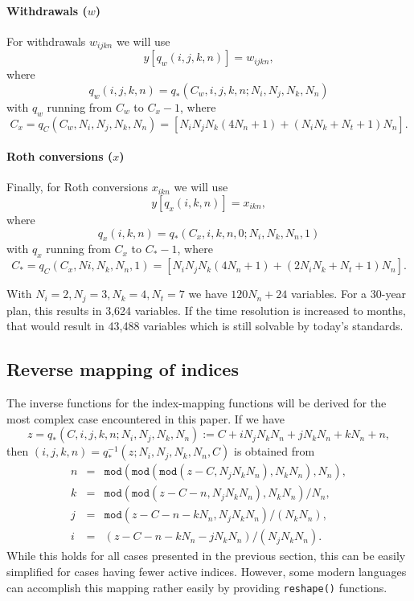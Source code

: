 \documentclass{article}[fleqn,12pt]
\begin{document}
\paragraph*{Withdrawals (\boldmath$w$)}
For withdrawals $w_{ijkn}$ we will use
\begin{equation}
	y[q_w(i, j, k, n)] = w_{i j k n},
\end{equation}
where
\begin{equation}
	q_w(i, j, k, n) = q_*(C_w, i, j, k, n; N_i, N_j, N_k, N_n)
\end{equation}
with $q_w$ running from $C_w$ to $C_x - 1$, where
\[
	C_x = q_C(C_w, N_i, N_j, N_k, N_n) = [N_iN_jN_k(4N_n + 1) + (N_iN_k + N_t + 1) N_n].
\]

\paragraph*{Roth conversions (\boldmath$x$)}
Finally, for Roth conversions $x_{ikn}$ we will use
\begin{equation}
	y[q_x(i, k, n)] = x_{i k n},
\end{equation}
where
\begin{equation}
	q_x(i, k, n) = q_*(C_x, i, k, n, 0; N_i, N_k, N_n, 1)
\end{equation}
with $q_x$ running from $C_x$ to $C_* - 1$, where
\[
	C_* = q_C(C_x, Ni, N_k, N_n, 1) = [N_iN_jN_k(4N_n + 1) + (2N_iN_k + N_t + 1) N_n].
\]

With $N_i = 2, N_j = 3, N_k = 4, N_t = 7$ we have $120N_n + 24$ variables. For
a 30-year plan, this results in 3,624 variables. If the time resolution is increased to
months, that would result in 43,488 variables which is still solvable by today's standards.

\subsection{Reverse mapping of indices}
The inverse functions for the index-mapping functions will be derived for the
most complex case encountered in this paper.
If we have
\begin{equation}
	z = q_*(C, i, j, k, n; N_i, N_j, N_k, N_n) := C + iN_jN_kN_n + jN_kN_n + kN_n + n,
\end{equation}
then $(i, j, k, n) = q_*^{-1}(z; N_i, N_j, N_k, N_n, C)$ is obtained from
\begin{eqnarray}
	n &=& \texttt{mod}(\texttt{mod}(\texttt{mod}(z - C, N_jN_kN_n), N_kN_n), N_n), \nonumber \\
	k &=& \texttt{mod}(\texttt{mod}(z - C - n, N_jN_kN_n), N_kN_n)/N_n, \nonumber \\
	j &=& \texttt{mod}(z - C - n - kN_n, N_jN_kN_n)/(N_kN_n), \nonumber \\
	i &=& (z - C - n - kN_n - jN_kN_n)/(N_jN_kN_n).
\end{eqnarray}
While this holds for all cases presented in the previous section, this can be easily simplified
for cases having fewer active indices. However, some modern languages can accomplish this
mapping rather easily by providing \texttt{reshape()} functions.
\end{document}
